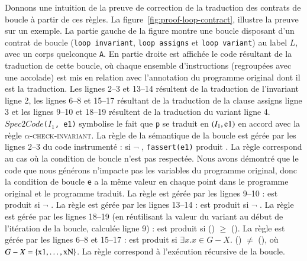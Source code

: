 Donnons une intuition de la preuve de correction de la traduction des
contrats de boucle à partir de ces règles.
La figure~\ref{fig:proof-loop-contract}, illustre la preuve sur un exemple.
La partie gauche de la figure montre une boucle disposant d'un contrat de boucle
(\lstinline'loop invariant', \lstinline'loop assigns' et
\lstinline'loop variant') au label $L$, avec un corps quelconque \lstinline'A'.
En partie droite est affichée le code résultant de la traduction de cette
boucle, où chaque ensemble d'instructions (regroupées avec une accolade) est
mis en relation avec l'annotation du programme original dont il est la
traduction.
Les lignes 2--3 et 13--14 résultent de la traduction de l'invariant ligne 2,
les lignes 6--8 et 15--17 résultant de la traduction de la clause assigns ligne
3 et les lignes 9--10 et 18--19 résultent de la traduction du variant ligne 4.
$Spec2Code$\lstinline'('$I_1$\lstinline', e1)' symbolise le fait que
\lstinline'p' se traduit en $(I_1, \mbox{\lstinline'e1'})$ en accord avec la
règle \textsc{$\alpha$-check-invariant}.
La règle  de la sémantique de la boucle est gérée par les
lignes 2--3 du code instrumenté : si $\lnot$ ,
\lstinline'fassert(e1)' produit \errorenv.
La règle  correspond au cas où la condition de boucle n'est
pas respectée.
Nous avons démontré que le code que nous générons n'impacte pas les variables
du programme original, donc la condition de boucle \lstinline'e' a la même
valeur en chaque point dans le programme original et le programme traduit.
La règle  est gérée par les lignes 9--10 : \errorenv est
produit si $\lnot$ .
La règle  est gérée par les lignes 13--14 : \errorenv est
produit si $\lnot$ .
La règle  est gérée par les lignes 18--19 (en réutilisant
la valeur du variant au début de l'itération de la boucle, calculée ligne 9) :
\errorenv est produit si () $\ge$
 ().
La règle  est gérée par les lignes 6--8 et 15--17 :
\errorenv est produit si $\exists x. x \in G-X.$
() $\ne$  (),
où $G-X = \{\mbox{\lstinline'x1'},\ldots,\mbox{\lstinline'xN'}\}$.
La règle  correspond à l'exécution récursive de la boucle.

